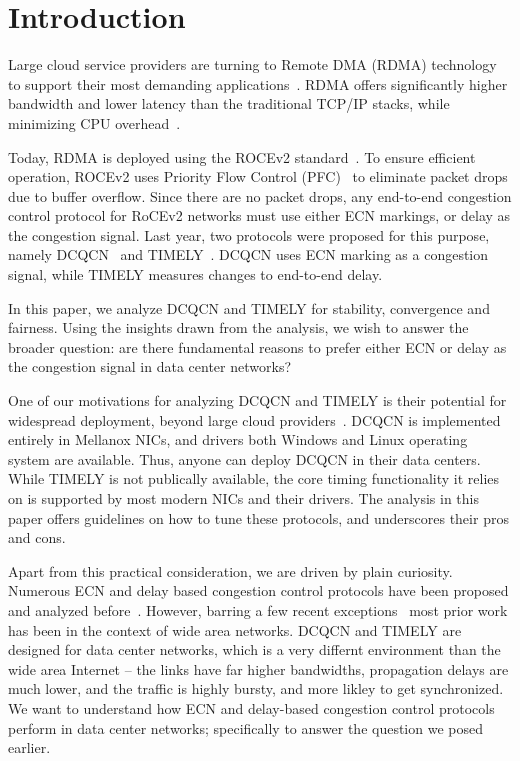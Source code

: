 \section{Introduction}

Large cloud service providers are turning to Remote DMA (RDMA) technology to
support their most demanding applications~\cite{dcqcn,timely,tcp-bolt}.  RDMA
offers significantly higher bandwidth and lower latency than the traditional
TCP/IP stacks, while minimizing CPU overhead~\cite{dcqcn,farm,timely}. 

Today, RDMA is deployed using the ROCEv2 standard~\cite{rocev2}. To ensure
efficient operation, ROCEv2 uses Priority Flow Control (PFC)~\cite{pfc} to
eliminate packet drops due to buffer overflow.  Since there are no packet drops,
any end-to-end congestion control protocol for RoCEv2 networks must use either
ECN markings, or delay as the congestion signal.  Last year, two protocols were
proposed for this purpose, namely DCQCN~\cite{dcqcn} and TIMELY~\cite{timely}.
DCQCN uses ECN marking as a congestion signal, while TIMELY measures changes to
end-to-end delay.


In this paper, we analyze DCQCN and TIMELY for stability, convergence and
fairness. Using the insights drawn from the analysis, we wish to answer the
broader question: are there fundamental reasons to prefer either ECN or delay as
the congestion signal in data center networks?


One of our motivations for analyzing DCQCN and TIMELY is their potential for
widespread deployment, beyond large cloud providers~\cite{dcqcn, timely}.  DCQCN
is implemented entirely in Mellanox NICs, and drivers both Windows and Linux
operating system are available. Thus, anyone can deploy DCQCN in their data
centers. While TIMELY is not publically available, the core timing functionality
it relies on is supported by most modern NICs and their drivers. The analysis in
this paper offers guidelines on how to tune these protocols, and underscores
their pros and cons.

Apart from this practical consideration, we are driven by plain curiosity.
Numerous ECN and delay based congestion control protocols have been proposed and
analyzed before~\cite{ecn,
tcp-vegas,misra2000fluid,hollot2001designing,misra:TAC2002,gorinsky2004feedback}.
However, barring a few recent exceptions~\cite{dctcp-analysis, qcn-analysis}
most prior work has been in the context of wide area networks. DCQCN and TIMELY
are designed for data center networks, which is a very differnt environment than
the wide area Internet -- the links have far higher bandwidths, propagation
delays are much lower, and the traffic is highly bursty, and more likley to get
synchronized.  We want to understand how ECN and delay-based congestion control
protocols perform in data center networks; specifically to answer the question
we posed earlier.

